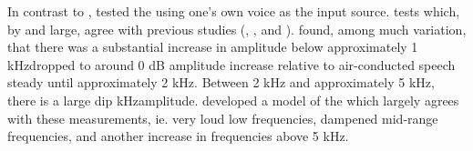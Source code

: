 In contrast to \DIFdelbegin {}\DIFdelend \DIFaddbegin {}\DIFaddend , \cite{hansen:97b} tested the \DIFdelbegin {}\DIFdelend \DIFaddbegin {}\DIFaddend using one's own voice as the input source.  %
%
%
\DIFdelbegin {}\DIFdelend \DIFaddbegin {}\DIFaddend tests %
which, by and large, agree with %
previous studies (\cite{wimmer:86}, \cite{thorup:96}, and \cite{may:92}).  \cite{hansen:97b} found, among much variation, that there was a substantial increase in amplitude below approximately 1 kHz\DIFdelbegin {}\DIFdelend \DIFaddbegin {}\DIFaddend dropped to around 0 dB amplitude increase relative to air-conducted speech \DIFdelbegin {}\DIFdelend \DIFaddbegin {}\DIFaddend steady until approximately 2 kHz.  Between 2 kHz and approximately 5 kHz, there is a large dip\DIFdelbegin {}\DIFdelend \DIFaddbegin {} kHz\DIFdelbegin {}\DIFdelend \DIFaddbegin {}\DIFaddend amplitude.  \cite{hansen:97b} developed a model of the \DIFdelbegin {}\DIFdelend \DIFaddbegin {}\DIFaddend which largely agrees with these measurements, ie. very loud low frequencies, dampened mid-range frequencies, and another increase in frequencies above 5 kHz.


